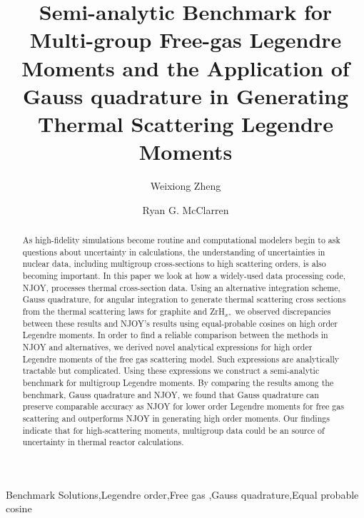 \documentclass[review]{elsarticle}
\newcommand{\zh}{ZrH$_x$}
\newcommand{\TAMU}{Texas A\&M University}
\begin{document}
\begin{frontmatter}

\title{Semi-analytic Benchmark for Multi-group Free-gas Legendre Moments and the Application of Gauss quadrature in Generating Thermal Scattering Legendre Moments}

\author[mymainaddress]{Weixiong Zheng}

\author[mymainaddress]{Ryan G. McClarren}

\address[mymainaddress]{Nuclear Engineering, \TAMU,~College Station, TX 77843-3133}

\begin{abstract}
As high-fidelity simulations become routine and computational modelers begin to ask questions about uncertainty in calculations, the understanding of uncertainties in nuclear data, including multigroup cross-sections to high scattering orders, is also becoming important. In this paper we look at how a widely-used data processing code, NJOY, processes thermal cross-section data.  Using an alternative integration scheme, Gauss quadrature, for angular integration to generate thermal scattering cross sections from the thermal scattering laws for graphite and \zh,~we observed discrepancies between these results and NJOY's results using equal-probable cosines on high order Legendre moments. In order to find a reliable comparison between the methods in NJOY and alternatives, we derived novel analytical expressions for high order Legendre moments of the free gas scattering model. Such expressions are analytically tractable but complicated. Using these expressions we construct a semi-analytic benchmark for multigroup Legendre moments. By comparing the results among the benchmark, Gauss quadrature and NJOY, we found that Gauss quadrature can preserve comparable accuracy as NJOY for lower order Legendre moments for free gas scattering and outperforms NJOY in generating high order moments. Our findings indicate that for high-scattering moments, multigroup data could be an source of uncertainty in thermal reactor calculations.
\end{abstract}

\begin{keyword}
Benchmark Solutions\sep Legendre order\sep Free gas \sep Gauss quadrature\sep Equal probable cosine
\end{keyword}

\end{frontmatter}
\end{document}
